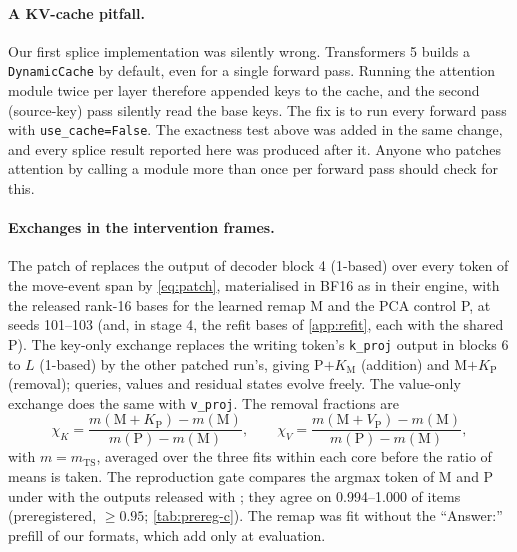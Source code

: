 \paragraph{A KV-cache pitfall.} Our first splice implementation was silently wrong. Transformers 5 builds a \texttt{DynamicCache} by default, even for a single forward pass. Running the attention module twice per layer therefore appended keys to the cache, and the second (source-key) pass silently read the base keys. The fix is to run every forward pass with \texttt{use\_cache=False}. The exactness test above was added in the same change, and every splice result reported here was produced after it. Anyone who patches attention by calling a module more than once per forward pass should check for this.

\paragraph{Exchanges in the intervention frames.} The patch of \citet{anonymous2026fitted} replaces the output of decoder block 4 (1-based) over every token of the move-event span by \cref{eq:patch}, materialised in BF16 as in their engine, with the released rank-16 bases for the learned remap M and the PCA control P, at seeds 101--103 (and, in stage 4, the refit bases of \cref{app:refit}, each with the shared P). The key-only exchange replaces the writing token's \texttt{k\_proj} output in blocks 6 to $L$ (1-based) by the other patched run's, giving P$+K_{\mathrm{M}}$ (addition) and M$+K_{\mathrm{P}}$ (removal); queries, values and residual states evolve freely. The value-only exchange does the same with \texttt{v\_proj}. The removal fractions are
\begin{equation*}
\chi_K = \frac{m(\mathrm{M}{+}K_{\mathrm{P}}) - m(\mathrm{M})}{m(\mathrm{P}) - m(\mathrm{M})}, \qquad
\chi_V = \frac{m(\mathrm{M}{+}V_{\mathrm{P}}) - m(\mathrm{M})}{m(\mathrm{P}) - m(\mathrm{M})},
\end{equation*}
with $m = m_{\mathrm{TS}}$, averaged over the three fits within each core before the ratio of means is taken. The reproduction gate compares the argmax token of M and P under \fmtOpt{} with the outputs released with \citet{anonymous2026fitted}; they agree on 0.994--1.000 of items (preregistered, $\geq 0.95$; \cref{tab:prereg-c}). The remap was fit without the ``Answer:'' prefill of our formats, which \citet{anonymous2026fitted} add only at evaluation.

